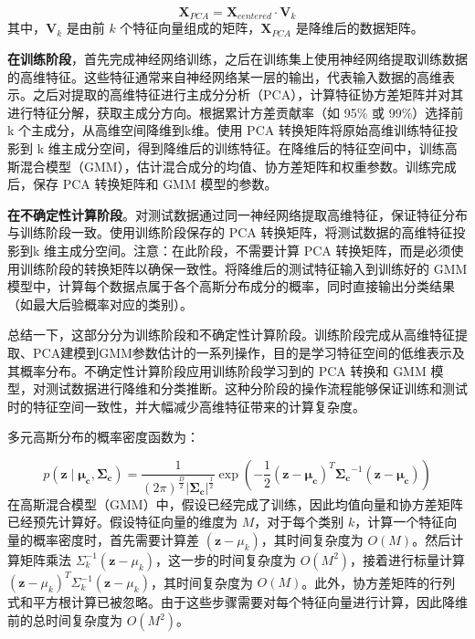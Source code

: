 \[
\mathbf{X}_{PCA} = \mathbf{X}_{centered} \cdot \mathbf{V}_k
\]
其中，\(\mathbf{V}_k\) 是由前 \(k\) 个特征向量组成的矩阵，\(\mathbf{X}_{PCA}\) 是降维后的数据矩阵。

\textbf{在训练阶段}，首先完成神经网络训练，之后在训练集上使用神经网络提取训练数据的高维特征。这些特征通常来自神经网络某一层的输出，代表输入数据的高维表示。之后对提取的高维特征进行主成分分析（PCA），计算特征协方差矩阵并对其进行特征分解，获取主成分方向。根据累计方差贡献率（如 95\% 或 99\%）选择前 k 个主成分，从高维空间降维到k维。使用 PCA 转换矩阵将原始高维训练特征投影到 k 维主成分空间，得到降维后的训练特征。在降维后的特征空间中，训练高斯混合模型（GMM），估计混合成分的均值、协方差矩阵和权重参数。训练完成后，保存 PCA 转换矩阵和 GMM 模型的参数。

\textbf{在不确定性计算阶段}。对测试数据通过同一神经网络提取高维特征，保证特征分布与训练阶段一致。使用训练阶段保存的 PCA 转换矩阵，将测试数据的高维特征投影到k 维主成分空间。注意：在此阶段，不需要计算 PCA 转换矩阵，而是必须使用训练阶段的转换矩阵以确保一致性。将降维后的测试特征输入到训练好的 GMM 模型中，计算每个数据点属于各个高斯分布成分的概率，同时直接输出分类结果（如最大后验概率对应的类别）。

总结一下，这部分分为训练阶段和不确定性计算阶段。训练阶段完成从高维特征提取、PCA建模到GMM参数估计的一系列操作，目的是学习特征空间的低维表示及其概率分布。不确定性计算阶段应用训练阶段学习到的 PCA 转换和 GMM 模型，对测试数据进行降维和分类推断。这种分阶段的操作流程能够保证训练和测试时的特征空间一致性，并大幅减少高维特征带来的计算复杂度。



多元高斯分布的概率密度函数为：

\[
p(\mathbf{z} \mid \boldsymbol{\mu_c}, \boldsymbol{\Sigma_c}) = \frac{1}{(2\pi)^{\frac{D}{2}} \left| \boldsymbol{\Sigma_c} \right|^{\frac{1}{2}}} \exp \left( -\frac{1}{2} (\mathbf{z} - \boldsymbol{\mu_c})^T \boldsymbol{\Sigma_c}^{-1} (\mathbf{z} - \boldsymbol{\mu_c}) \right)
\]
在高斯混合模型（GMM）中，假设已经完成了训练，因此均值向量和协方差矩阵已经预先计算好。假设特征向量的维度为 \( M \)，对于每个类别 \( k \)，计算一个特征向量的概率密度时，首先需要计算差 \( (\mathbf{z} - \mu_k) \)，其时间复杂度为 \( O(M) \)。然后计算矩阵乘法 \( \Sigma_k^{-1} (\mathbf{z} - \mu_k) \)，这一步的时间复杂度为 \( O(M^2) \)，接着进行标量计算 \( (\mathbf{z} - \mu_k)^T \Sigma_k^{-1} (\mathbf{z} - \mu_k) \)，其时间复杂度为 \( O(M) \)。此外，协方差矩阵的行列式和平方根计算已被忽略。由于这些步骤需要对每个特征向量进行计算，因此降维前的总时间复杂度为 \( O(M^2) \)。

